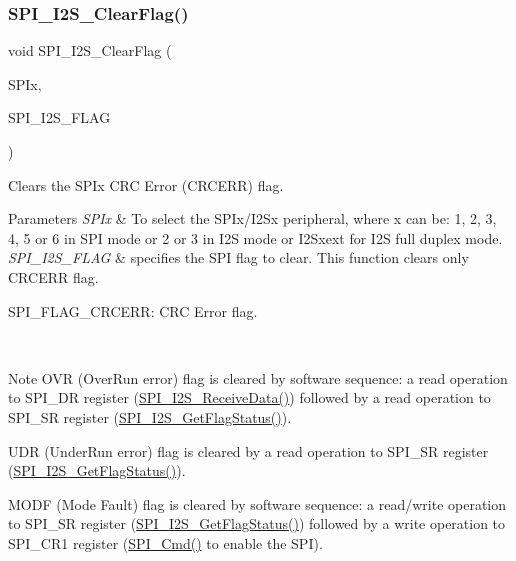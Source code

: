 \subsubsection{\texorpdfstring{S\+P\+I\+\_\+\+I2\+S\+\_\+\+Clear\+Flag()}{SPI\_I2S\_ClearFlag()}}
{\footnotesize\ttfamily void S\+P\+I\+\_\+\+I2\+S\+\_\+\+Clear\+Flag (\begin{DoxyParamCaption}\item[{S\+P\+I\+\_\+\+Type\+Def $\ast$}]{S\+P\+Ix,  }\item[{uint16\+\_\+t}]{S\+P\+I\+\_\+\+I2\+S\+\_\+\+F\+L\+AG }\end{DoxyParamCaption})}



Clears the S\+P\+Ix C\+RC Error (C\+R\+C\+E\+RR) flag. 


\begin{DoxyParams}{Parameters}
{\em S\+P\+Ix} & To select the S\+P\+Ix/\+I2\+Sx peripheral, where x can be\+: 1, 2, 3, 4, 5 or 6 in S\+PI mode or 2 or 3 in I2S mode or I2\+Sxext for I2S full duplex mode. \\
\hline
{\em S\+P\+I\+\_\+\+I2\+S\+\_\+\+F\+L\+AG} & specifies the S\+PI flag to clear. This function clears only C\+R\+C\+E\+RR flag. \begin{DoxyItemize}
\item S\+P\+I\+\_\+\+F\+L\+A\+G\+\_\+\+C\+R\+C\+E\+RR\+: C\+RC Error flag. ~\newline
 \end{DoxyItemize}
\\
\hline
\end{DoxyParams}
\begin{DoxyNote}{Note}
O\+VR (Over\+Run error) flag is cleared by software sequence\+: a read operation to S\+P\+I\+\_\+\+DR register (\mbox{\hyperlink{group___s_p_i___group2_gab77de76547f3bff403236b263b070a30}{S\+P\+I\+\_\+\+I2\+S\+\_\+\+Receive\+Data()}}) followed by a read operation to S\+P\+I\+\_\+\+SR register (\mbox{\hyperlink{group___s_p_i___group5_ga1bd785d129e09c5734a876c8f2767204}{S\+P\+I\+\_\+\+I2\+S\+\_\+\+Get\+Flag\+Status()}}). 

U\+DR (Under\+Run error) flag is cleared by a read operation to S\+P\+I\+\_\+\+SR register (\mbox{\hyperlink{group___s_p_i___group5_ga1bd785d129e09c5734a876c8f2767204}{S\+P\+I\+\_\+\+I2\+S\+\_\+\+Get\+Flag\+Status()}}). ~\newline


M\+O\+DF (Mode Fault) flag is cleared by software sequence\+: a read/write operation to S\+P\+I\+\_\+\+SR register (\mbox{\hyperlink{group___s_p_i___group5_ga1bd785d129e09c5734a876c8f2767204}{S\+P\+I\+\_\+\+I2\+S\+\_\+\+Get\+Flag\+Status()}}) followed by a write operation to S\+P\+I\+\_\+\+C\+R1 register (\mbox{\hyperlink{group___s_p_i___group1_gaa31357879a65ee1ed7223f3b9114dcf3}{S\+P\+I\+\_\+\+Cmd()}} to enable the S\+PI).
\end{DoxyNote}

